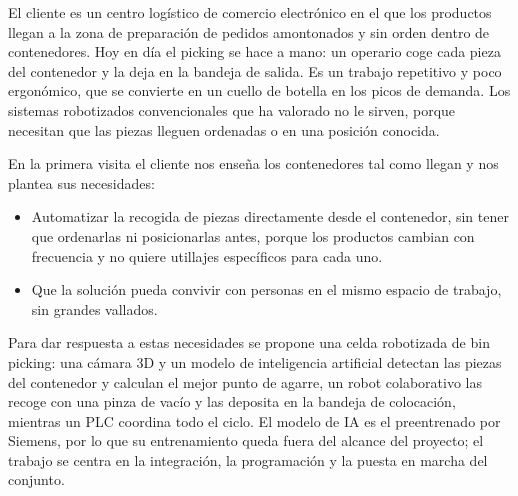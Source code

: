 El cliente es un centro logístico de comercio electrónico en el que los productos llegan a la zona de preparación
de pedidos amontonados y sin orden dentro de contenedores. Hoy en día el picking se hace a mano: un operario coge
cada pieza del contenedor y la deja en la bandeja de salida. Es un trabajo repetitivo y poco ergonómico, que se
convierte en un cuello de botella en los picos de demanda. Los sistemas robotizados convencionales que ha
valorado no le sirven, porque necesitan que las piezas lleguen ordenadas o en una posición conocida.

En la primera visita el cliente nos enseña los contenedores tal como llegan y nos plantea sus necesidades:
\begin{itemize}
	\item Automatizar la recogida de piezas directamente desde el contenedor, sin tener que ordenarlas ni
	      posicionarlas antes, porque los productos cambian con frecuencia y no quiere utillajes específicos
	      para cada uno.
	\item Que la solución pueda convivir con personas en el mismo espacio de trabajo, sin grandes vallados.
\end{itemize}

Para dar respuesta a estas necesidades se propone una celda robotizada de bin picking: una cámara 3D y un modelo
de inteligencia artificial detectan las piezas del contenedor y calculan el mejor punto de agarre, un robot
colaborativo las recoge con una pinza de vacío y las deposita en la bandeja de colocación, mientras un PLC coordina
todo el ciclo. El modelo de IA es el preentrenado por
Siemens, por lo que su entrenamiento queda fuera del alcance del proyecto; el trabajo se centra en la
integración, la programación y la puesta en marcha del conjunto.
